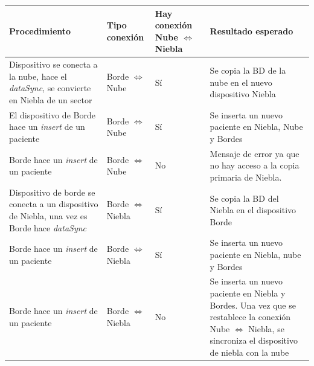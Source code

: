 \begin{table}[h]

\label{tabla:evArq} 
\begin{tabular}{|m{5cm}|m{2.5cm}|m{2cm}|m{5cm}|} \hline           
    \centering\textbf{Procedimiento} & \centering\textbf{Tipo conexión} & \centering\textbf{Hay conexión Nube $\Leftrightarrow$ Niebla} & \begin{center}
        \textbf{Resultado esperado}
    \end{center}  \\
    
    \hline Dispositivo se conecta a la nube, hace el \textit{dataSync}, se convierte en Niebla de un sector & Borde $\Leftrightarrow$ Nube & Sí & Se copia la BD de la nube en el nuevo dispositivo Niebla  \\ 
    \hline El dispositivo de Borde hace un \textit{insert} de un paciente & Borde $\Leftrightarrow$ Nube & Sí & Se inserta un nuevo paciente en Niebla, Nube y Bordes\\
    \hline Borde hace un \textit{insert} de un paciente & Borde $\Leftrightarrow$ Nube & No & Mensaje de error ya que no hay acceso a la copia primaria de Niebla. \\
    \hline Dispositivo de borde se conecta a un dispositivo de Niebla, una vez es Borde hace \textit{dataSync} & Borde $\Leftrightarrow$ Niebla & Sí & Se copia la BD del Niebla en el dispositivo Borde \\
    \hline Borde hace un \textit{insert} de un paciente & Borde $\Leftrightarrow$ Niebla & Sí & Se inserta un nuevo paciente en Niebla, nube y Bordes \\
    \hline Borde hace un \textit{insert} de un paciente & Borde $\Leftrightarrow$ Niebla & No & Se inserta un nuevo paciente en Niebla y Bordes. Una vez que se restablece la conexión Nube $\Leftrightarrow$ Niebla, se sincroniza el dispositivo de niebla con la nube \\
    \hline\end{tabular} 

\end{table}

